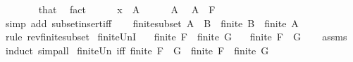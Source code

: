 \begin{isabellebody}
\ \ \ \ \ \ \isamarkupfalse%
\ that\ \isamarkupfalse%
\ fact\isanewline
\ \ \ \ \isamarkupfalse%
\ {\isachardoublequoteopen}x\ {\isasymnotin}\ A{\isachardoublequoteclose}\isanewline
\ \ \ \ \isamarkupfalse%
\ A\ \isamarkupfalse%
\ {\isachardoublequoteopen}A\ {\isasymsubseteq}\ F{\isachardoublequoteclose}\isanewline
\ \ \ \ \ \ \isamarkupfalse%
\ {\isacharparenleft}{\kern0pt}simp\ add{\isacharcolon}{\kern0pt}\ subset{\isacharunderscore}{\kern0pt}insert{\isacharunderscore}{\kern0pt}iff{\isacharparenright}{\kern0pt}\isanewline
\ \ \isamarkupfalse%
\isanewline
{}\isamarkupfalse%
%
\endisatagproof
{\isafoldproof}%
%
\isadelimproof
\isanewline
%
\endisadelimproof
\isanewline
{}\isamarkupfalse%
\ finite{\isacharunderscore}{\kern0pt}subset{\isacharcolon}{\kern0pt}\ {\isachardoublequoteopen}A\ {\isasymsubseteq}\ B\ {\isasymLongrightarrow}\ finite\ B\ {\isasymLongrightarrow}\ finite\ A{\isachardoublequoteclose}\isanewline
%
\isadelimproof
\ \ %
\endisadelimproof
%
\isatagproof
{}\isamarkupfalse%
\ {\isacharparenleft}{\kern0pt}rule\ rev{\isacharunderscore}{\kern0pt}finite{\isacharunderscore}{\kern0pt}subset{\isacharparenright}{\kern0pt}%
\endisatagproof
{\isafoldproof}%
%
\isadelimproof
\isanewline
%
\endisadelimproof
\isanewline
{}\isamarkupfalse%
\ finite{\isacharunderscore}{\kern0pt}UnI{\isacharcolon}{\kern0pt}\isanewline
\ \ \ {\isachardoublequoteopen}finite\ F{\isachardoublequoteclose}\ \ {\isachardoublequoteopen}finite\ G{\isachardoublequoteclose}\isanewline
\ \ \ {\isachardoublequoteopen}finite\ {\isacharparenleft}{\kern0pt}F\ {\isasymunion}\ G{\isacharparenright}{\kern0pt}{\isachardoublequoteclose}\isanewline
%
\isadelimproof
\ \ %
\endisadelimproof
%
\isatagproof
{}\isamarkupfalse%
\ assms\ \isamarkupfalse%
\ induct\ simp{\isacharunderscore}{\kern0pt}all%
\endisatagproof
{\isafoldproof}%
%
\isadelimproof
\isanewline
%
\endisadelimproof
\isanewline
{}\isamarkupfalse%
\ finite{\isacharunderscore}{\kern0pt}Un\ {\isacharbrackleft}{\kern0pt}iff{\isacharbrackright}{\kern0pt}{\isacharcolon}{\kern0pt}\ {\isachardoublequoteopen}finite\ {\isacharparenleft}{\kern0pt}F\ {\isasymunion}\ G{\isacharparenright}{\kern0pt}\ {\isasymlongleftrightarrow}\ finite\ F\ {\isasymand}\ finite\ G{\isachardoublequoteclose}\isanewline
%
\isadelimproof
\ \ %
\endisadelimproof
%
\isatagproof
{}\isamarkupfalse%

\end{isabellebody}
